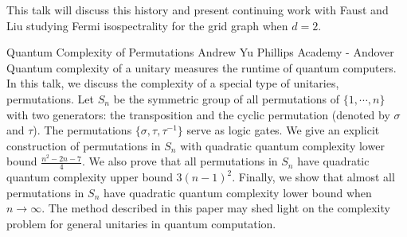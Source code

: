 \begin{addmargin}[2em]{0em}
{This talk will discuss this history and present continuing work with Faust and
Liu studying Fermi isospectrality for the grid graph when $d=2$.}


\vspace{1.5ex}
\abs
{Quantum Complexity of Permutations}
{Andrew Yu}
{Phillips Academy - Andover}
{Quantum complexity of a unitary measures  the runtime of quantum computers. In this talk, we discuss the complexity of a special type of unitaries, permutations. Let $S_n$ be the symmetric  group of all permutations of  $\{1, \cdots, n\}$ with two generators: the transposition
and the cyclic permutation (denoted by $\sigma$ and $\tau$). The permutations $\{\sigma, \tau, \tau^{-1}\}$ serve as logic gates. We give an explicit construction of  permutations in $S_n$ with quadratic quantum complexity lower bound $\frac{n^2-2n-7}{4}$. We also prove that all permutations in $S_n$ have quadratic  quantum complexity upper bound $3 (n-1)^2$. Finally, we show that almost all permutations in $S_n$ have quadratic quantum complexity lower bound when $n\rightarrow \infty$. The method described in this paper may shed light on the  complexity problem for general unitaries in quantum computation.}
\end{addmargin}
